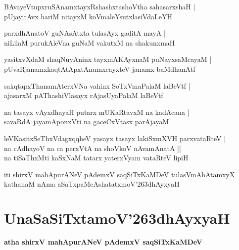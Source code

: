 \documentclass[twoside,12pt,openright]{book}
\def\S{\char'263}
\newcounter{shloka}[chapter]
\begin{document}
\begin{shloka}%
BAvayeVtupxruSAnamxtayxRshashxtashoVtha sahasarxshaH |\\
pUjayitAvx hariM nitayxM koVmaleYsutxlasiVdaLeYH 
\end{shloka}

\begin{shloka}%
parxdhAnatoV guNAsAtxta tulasAyx gaditA mayA |\\
niLilaM purukAleVna guNaM vakutxM na shakunxmaH 
\end{shloka}

\begin{shloka}%
yasitxvXdaM shaqNuyAninx tayxmAKAyxnaM puNayxsaMcayaM |\\
pUvaRjanamxkaqtAtApxtAnumxcayxteV janamx baMdhanAtf
\end{shloka}

\begin{shloka}%
sakqtapxThanamAterxVNa vahinx SoTxVmaPalaM laBeVtf |\\
ajasarxM pAThashiVlasayx rAjasUyaPalaM laBeVtf
\end{shloka}

\begin{shloka}%
na tasayx vAyxdhayaH putarx mUKaRtavxM na kadAcana |\\
savaRdA jayamAponxVti na gaceCxVtasx parAjayaM 
\end{shloka}

\begin{shloka}%
leVKasitxSeThxVdagxqqheV yasayx tasayx lakiSxmXVH parxvataRteV |\\
na cAdhayoV na ca perxVtA na shoVkoV nAvamAnatA ||\\
na tiSaThxMti kaSxNaM tatarx yaterxVyam vataRteV lipiH 
\end{shloka}

\begin{center}
iti shirxV mahApurANeV pAdemxV saqSiTxKaMDeV tulasVmAhAtamxyX kathanaM 
nAma aSaTxpaMcAshatatxmoV\S dhAyxyaH 
\end{center}

\chapter{UnaSaSiTxtamoV\S dhAyxyaH}

\begin{center}
{\LARGE\bfseries atha shirxV mahApurANeV pAdemxV saqSiTxKaMDeV}
\end{center}
\end{document}
